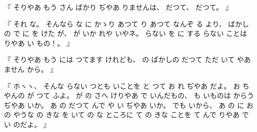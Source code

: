 %
『
そりやあ
もう
さん
ばかり
ぢやあ
りませんは、
%
だつて、
%
だつて。
』

%
『
それ
な。
%
そんなら
な
に
かゝり
あつて
り
あつて
なんぞ
る
より、
%
ばかしの
で%
に
を
けた
が、
%
%
が
いか
れや
いやネ。
%
らない
を
に
する
らない
ことは
りやあ
い
もの！。
』

%
『
そりやあ
もう
には
つてます
けれども、
%
の
ばかしの
だつて
ただ%
いて
やあ
ません
から。
』

%
『
ホヽヽ、
%
そんな
らない
つとも
いことを
と
つて
お
れ
ぢやあ
だよ。
%
お
ちやんの
が
つて
ふよ。
%
%
が
の
さへ
けりやあ
で
いんだもの、
%
も
いものは
からう
ぢやあ
いか。
%
あ
の
だつて
んで
や
い
ぢやあ
いか。
%
でも
いから、
%
あ
の
に
お
の
やうな
%
の
きな
を
いて
%
の
な
ところに
て
%
の
きな
ことを
て
んで
りやあ
で
い
のだよ。
』
